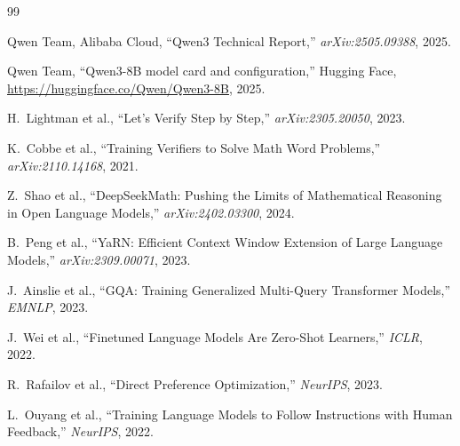 \documentclass[11pt,a4paper]{article}
\begin{document}
\begin{thebibliography}{99}

Qwen Team, Alibaba Cloud, ``Qwen3 Technical Report,'' \textit{arXiv:2505.09388}, 2025.

Qwen Team, ``Qwen3-8B model card and configuration,'' Hugging Face,
\url{https://huggingface.co/Qwen/Qwen3-8B}, 2025.

H.~Lightman et al., ``Let's Verify Step by Step,'' \textit{arXiv:2305.20050}, 2023.

K.~Cobbe et al., ``Training Verifiers to Solve Math Word Problems,'' \textit{arXiv:2110.14168}, 2021.

Z.~Shao et al., ``DeepSeekMath: Pushing the Limits of Mathematical Reasoning in Open Language
Models,'' \textit{arXiv:2402.03300}, 2024.

B.~Peng et al., ``YaRN: Efficient Context Window Extension of Large Language Models,''
\textit{arXiv:2309.00071}, 2023.

J.~Ainslie et al., ``GQA: Training Generalized Multi-Query Transformer Models,''
\textit{EMNLP}, 2023.

J.~Wei et al., ``Finetuned Language Models Are Zero-Shot Learners,'' \textit{ICLR}, 2022.

R.~Rafailov et al., ``Direct Preference Optimization,'' \textit{NeurIPS}, 2023.

L.~Ouyang et al., ``Training Language Models to Follow Instructions with Human Feedback,''
\textit{NeurIPS}, 2022.

\end{thebibliography}
\end{document}
